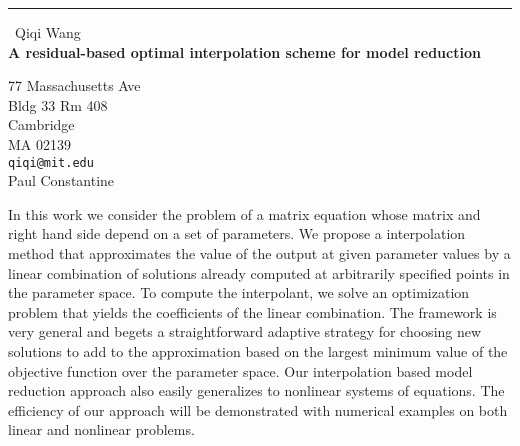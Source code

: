 \documentclass{report}
\begin{document}
\begin{center}
\rule{6in}{1pt} \
{\large Qiqi Wang \\
{\bf A residual-based optimal interpolation scheme for model reduction}}

77 Massachusetts Ave \\ Bldg 33 Rm 408 \\ Cambridge \\ MA 02139
\\
{\tt qiqi@mit.edu}\\
Paul Constantine\end{center}

In this work we consider the problem of a matrix equation whose
matrix and right hand side depend on a set of parameters. We propose a
interpolation method that approximates the value of the output at given
parameter values by a linear combination of solutions already computed at
arbitrarily specified points in the parameter space. To compute the
interpolant, we solve an optimization problem that yields the
coefficients of the linear combination. The framework is very general and
begets a straightforward adaptive strategy for choosing new solutions to
add to the approximation based on the largest minimum value of the
objective function over the parameter space. Our interpolation based
model reduction approach also easily generalizes to nonlinear systems of
equations. The efficiency of our approach will be demonstrated with
numerical examples on both linear and nonlinear problems.
\end{document}
